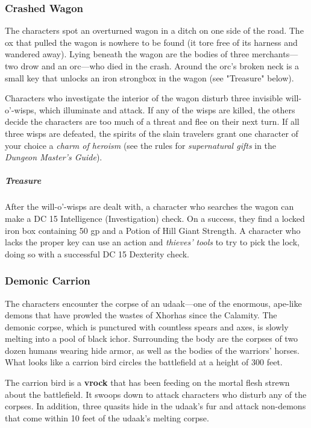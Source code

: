 \documentclass[10pt,a4paper,twoside,bg=print,twocolumn,openany,nodeprecatedcode]{dndbook}
\begin{document}
\subsubsection{Crashed Wagon}
The characters spot an overturned wagon in a ditch on one side of the road. The ox that pulled the wagon is nowhere to be found (it tore free of its harness and wandered away). Lying beneath the wagon are the bodies of three merchants—two drow and an orc—who died in the crash. Around the orc's broken neck is a small key that unlocks an iron strongbox in the wagon (see "Treasure" below).

Characters who investigate the interior of the wagon disturb three invisible will-o'-wisps, which illuminate and attack. If any of the wisps are killed, the others decide the characters are too much of a threat and flee on their next turn. If all three wisps are defeated, the spirits of the slain travelers grant one character of your choice a \textit{charm of heroism} (see the rules for \textit{supernatural gifts} in the \textit{Dungeon Master's Guide}).

\subparagraph{Treasure}
After the will-o'-wisps are dealt with, a character who searches the wagon can make a DC 15 Intelligence (Investigation) check. On a success, they find a locked iron box containing 50 gp and a Potion of Hill Giant Strength. A character who lacks the proper key can use an action and \textit{thieves' tools} to try to pick the lock, doing so with a successful DC 15 Dexterity check.

\subsubsection{Demonic Carrion}
The characters encounter the corpse of an udaak—one of the enormous, ape-like demons that have prowled the wastes of Xhorhas since the Calamity. The demonic corpse, which is punctured with countless spears and axes, is slowly melting into a pool of black ichor. Surrounding the body are the corpses of two dozen humans wearing hide armor, as well as the bodies of the warriors' horses. What looks like a carrion bird circles the battlefield at a height of 300 feet.

The carrion bird is a \textbf{vrock} that has been feeding on the mortal flesh strewn about the battlefield. It swoops down to attack characters who disturb any of the corpses. In addition, three quasits hide in the udaak's fur and attack non-demons that come within 10 feet of the udaak's melting corpse.
\end{document}
